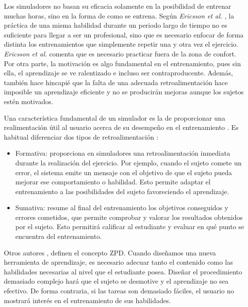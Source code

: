 Los simuladores no basan su eficacia solamente en la posibilidad de entrenar muchas horas, sino en la forma de como se entrena. Según \emph{Ericsson et al.} \cite{ericsson1993role}, la práctica de una misma habilidad durante un periodo largo de tiempo no es suficiente para llegar a ser un profesional, sino que es necesario enfocar de forma distinta los entrenamientos que simplemente repetir una y otra vez el ejercicio. \emph{Ericsson et al.} comenta que es necesario practicar fuera de la zona de confort. Por otra parte, la motivación es algo fundamental en el entrenamiento, pues sin ella, el aprendizaje se ve ralentizado e incluso ser contraproducente. Además, también hace hincapié que la falta de una adecuada retroalimentación hace imposible un aprendizaje eficiente y no se producirán mejoras aunque los sujetos estén motivados. 

Una característica fundamental de un simulador es la de proporcionar una realimentación útil al usuario acerca de su desempeño en el entrenamiento \cite{ericsson1993role}. Es habitual diferenciar dos tipos de retroalimentación \cite{Sando2013}: 
\begin{itemize}
    \item Formativa: proporciona en simuladores una retroalimentación inmediata durante la realización del ejercicio. Por ejemplo, cuando el sujeto comete un error, el sistema emite un mensaje con el objetivo de que el sujeto pueda mejorar ese comportamiento o habilidad.  Esto permite adaptar el entrenamiento a las posibilidades del sujeto favoreciendo el aprendizaje. %
    \item Sumativa: resume al final del entrenamiento los objetivos conseguidos y errores cometidos, que permite comprobar y valorar los resultados obtenidos por el sujeto. Esto permitirá calificar al estudiante y evaluar en qué punto se encuentra del entrenamiento.
\end{itemize}


Otros autores \cite{zpd}, definen el concepto \ac{ZPD}. Cuando diseñamos una nueva herramienta de aprendizaje, es necesario adecuar tanto el contenido como las habilidades necesarias al nivel que el estudiante posea. Diseñar el procedimiento demasiado complejo hará que el sujeto se desmotive y el aprendizaje no sea efectivo. De forma contraria, si las tareas son demasiado fáciles, el usuario no mostrará interés en el entrenamiento de sus habilidades.


